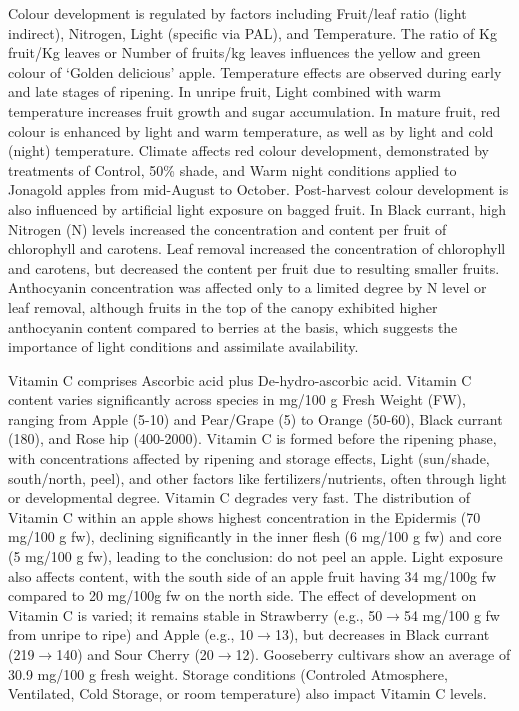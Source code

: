 \vspace{0.5em}
Colour development is regulated by factors including Fruit/leaf ratio (light indirect), Nitrogen, Light (specific via PAL), and Temperature. The ratio of Kg fruit/Kg leaves or Number of fruits/kg leaves influences the yellow and green colour of ‘Golden delicious' apple. Temperature effects are observed during early and late stages of ripening. In unripe fruit, Light combined with warm temperature increases fruit growth and sugar accumulation. In mature fruit, red colour is enhanced by light and warm temperature, as well as by light and cold (night) temperature. Climate affects red colour development, demonstrated by treatments of Control, 50\% shade, and Warm night conditions applied to Jonagold apples from mid-August to October. Post-harvest colour development is also influenced by artificial light exposure on bagged fruit. In Black currant, high Nitrogen (N) levels increased the concentration and content per fruit of chlorophyll and carotens. Leaf removal increased the concentration of chlorophyll and carotens, but decreased the content per fruit due to resulting smaller fruits. Anthocyanin concentration was affected only to a limited degree by N level or leaf removal, although fruits in the top of the canopy exhibited higher anthocyanin content compared to berries at the basis, which suggests the importance of light conditions and assimilate availability.

\vspace{0.5em}
Vitamin C comprises Ascorbic acid plus De-hydro-ascorbic acid. Vitamin C content varies significantly across species in mg/100 g Fresh Weight (FW), ranging from Apple (5-10) and Pear/Grape (5) to Orange (50-60), Black currant (180), and Rose hip (400-2000). Vitamin C is formed before the ripening phase, with concentrations affected by ripening and storage effects, Light (sun/shade, south/north, peel), and other factors like fertilizers/nutrients, often through light or developmental degree. Vitamin C degrades very fast. The distribution of Vitamin C within an apple shows highest concentration in the Epidermis (70 mg/100 g fw), declining significantly in the inner flesh (6 mg/100 g fw) and core (5 mg/100 g fw), leading to the conclusion: do not peel an apple. Light exposure also affects content, with the south side of an apple fruit having 34 mg/100g fw compared to 20 mg/100g fw on the north side. The effect of development on Vitamin C is varied; it remains stable in Strawberry (e.g., 50$\rightarrow$54 mg/100 g fw from unripe to ripe) and Apple (e.g., 10$\rightarrow$13), but decreases in Black currant (219$\rightarrow$140) and Sour Cherry (20$\rightarrow$12). Gooseberry cultivars show an average of 30.9 mg/100 g fresh weight. Storage conditions (Controled Atmosphere, Ventilated, Cold Storage, or room temperature) also impact Vitamin C levels.



